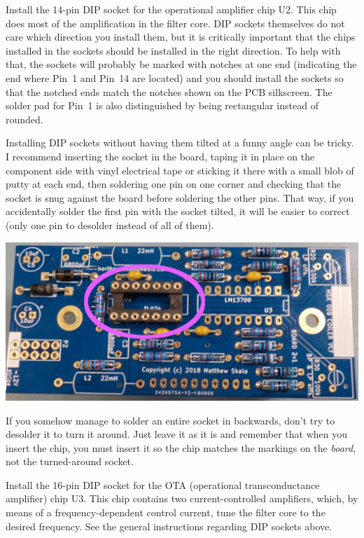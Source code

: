 Install the 14-pin DIP socket for the operational amplifier chip U2.  This
chip does most of the amplification in the filter core.  DIP sockets
themselves do not care which direction you install them, but it is
critically important that the chips installed in the sockets should be
installed in the right direction.  To help with that, the sockets will
probably be marked with notches at one end (indicating the end where Pin~1
and Pin~14 are located) and you should install the sockets so that the
notched ends match the notches shown on the PCB silkscreen.  The solder pad
for Pin~1 is also distinguished by being rectangular instead of rounded.

Installing DIP sockets without having them tilted at a funny angle can be
tricky.  I recommend inserting the socket in the board, taping it in place
on the component side with vinyl electrical tape or sticking it there with a
small blob of putty at each end, then soldering one pin on
one corner and checking that the socket is snug against the board before
soldering the other pins.  That way, if you accidentally solder the first
pin with the socket tilted, it will be easier to correct (only one pin to
desolder instead of all of them).

\nopagebreak
\noindent\includegraphics[width=\linewidth]{dip14-2.jpg}

If you somehow manage to solder an entire socket in backwards, don't try to
desolder it to turn it around.  Just leave it as it is and remember that
when you insert the chip, you must insert it so the chip matches the
markings on the \emph{board}, not the turned-around socket.

Install the 16-pin DIP socket for the OTA (operational transconductance
amplifier) chip U3.  This chip contains two current-controlled amplifiers,
which, by means of a frequency-dependent control current, tune the filter
core to the desired frequency.  See the general instructions regarding DIP
sockets above.

